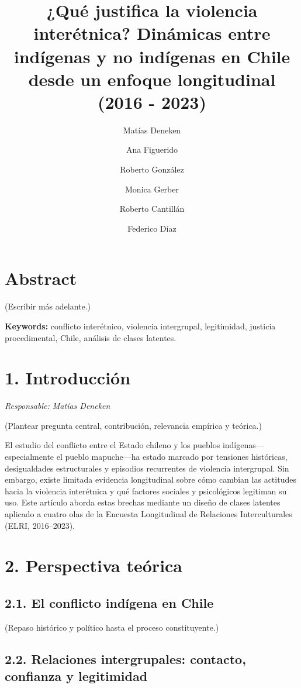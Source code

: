 \documentclass[
  letterpaper,
  DIV=11,
  numbers=noendperiod]{scrartcl}
\title{¿Qué justifica la violencia interétnica? Dinámicas entre
indígenas y no indígenas en Chile desde un enfoque longitudinal (2016 -
2023)}
\author{Matías Deneken \and Ana Figuerido \and Roberto
González \and Monica Gerber \and Roberto Cantillán \and Federico Díaz}
\date{}
\renewcommand*\contentsname{Table of contents}
\newcommand\contentsname{Table of contents}
\begin{document}
\maketitle

\renewcommand*\contentsname{Table of contents}
{
\hypersetup{linkcolor=}
\setcounter{tocdepth}{3}
\tableofcontents
}

\section{Abstract}\label{abstract}

(Escribir más adelante.)

\textbf{Keywords:} conflicto interétnico, violencia intergrupal,
legitimidad, justicia procedimental, Chile, análisis de clases latentes.

\section{1. Introducción}\label{introducciuxf3n}

\emph{Responsable: Matías Deneken}

(Plantear pregunta central, contribución, relevancia empírica y
teórica.)

El estudio del conflicto entre el Estado chileno y los pueblos
indígenas---especialmente el pueblo mapuche---ha estado marcado por
tensiones históricas, desigualdades estructurales y episodios
recurrentes de violencia intergrupal. Sin embargo, existe limitada
evidencia longitudinal sobre cómo cambian las actitudes hacia la
violencia interétnica y qué factores sociales y psicológicos legitiman
su uso. Este artículo aborda estas brechas mediante un diseño de clases
latentes aplicado a cuatro olas de la Encuesta Longitudinal de
Relaciones Interculturales (ELRI, 2016--2023).

\section{2. Perspectiva teórica}\label{perspectiva-teuxf3rica}

\subsection{2.1. El conflicto indígena en
Chile}\label{el-conflicto-induxedgena-en-chile}

(Repaso histórico y político hasta el proceso constituyente.)

\subsection{2.2. Relaciones intergrupales: contacto, confianza y
legitimidad}\label{relaciones-intergrupales-contacto-confianza-y-legitimidad}
\end{document}
